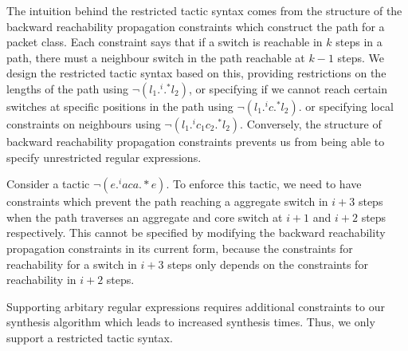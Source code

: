 The intuition behind the restricted tactic syntax comes from the structure of the backward reachability propagation 
constraints which construct the path for a packet class. Each constraint says that if a switch is reachable in $k$ steps in a path,
 there must a neighbour switch in the path reachable at $k-1$ steps. We design the restricted tactic syntax based
  on this, providing restrictions on the lengths of the path using $\neg (l_1 .^i .^* l_2)$, or specifying if we cannot 
  reach certain switches at specific positions in the path using  $\neg (l_1 .^i c .^* l_2)$. or specifying local 
  constraints on neighbours using $\neg (l_1  .^i c_1 c_2 .^* l_2)$.  
  Conversely, the structure of backward reachability propagation constraints 
  prevents us from being able to specify unrestricted regular expressions. 
  \begin{example}
  Consider a tactic $\neg(e .^i a c a .*e)$. To enforce
  this tactic, we need to have constraints which prevent the path reaching a aggregate switch in $i+3$
  steps when the path traverses an aggregate and core switch at $i+1$ and $i+2$ steps
  respectively. This cannot be specified by modifying the backward reachability propagation 
  constraints in its current form, 
  because the constraints for reachability for a switch in $i + 3$ steps only depends on 
  the constraints for reachability in $i+2$ steps. 
   \end{example}
   Supporting arbitary regular expressions
   requires additional constraints to our synthesis algorithm which leads to increased synthesis times. Thus, we only support a restricted tactic syntax.   

